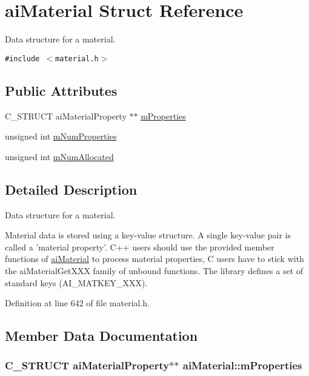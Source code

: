 \hypertarget{structai_material}{
\section{aiMaterial Struct Reference}
\label{structai_material}
}
Data structure for a material.  


{\tt \#include $<$material.h$>$}

\subsection*{Public Attributes}
\begin{CompactItemize}
\item 
C\_\-STRUCT aiMaterialProperty $\ast$$\ast$ \hyperlink{structai_material_f32b125d54bff5bc1fc54a1007487cab}{mProperties}
\item 
unsigned int \hyperlink{structai_material_243b07afdc6507f8878c93a2cafe4963}{mNumProperties}
\item 
unsigned int \hyperlink{structai_material_84a0016a263362c52b27a9d8d76dc449}{mNumAllocated}
\end{CompactItemize}


\subsection{Detailed Description}
Data structure for a material. 

Material data is stored using a key-value structure. A single key-value pair is called a 'material property'. C++ users should use the provided member functions of \hyperlink{structai_material}{aiMaterial} to process material properties, C users have to stick with the aiMaterialGetXXX family of unbound functions. The library defines a set of standard keys (AI\_\-MATKEY\_\-XXX). 

Definition at line 642 of file material.h.

\subsection{Member Data Documentation}
\hypertarget{structai_material_f32b125d54bff5bc1fc54a1007487cab}{
\subsubsection[mProperties]{\setlength{\rightskip}{0pt plus 5cm}C\_\-STRUCT aiMaterialProperty$\ast$$\ast$ {\bf aiMaterial::mProperties}}}
\label{structai_material_f32b125d54bff5bc1fc54a1007487cab}


